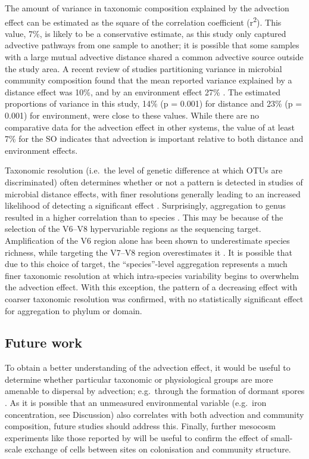 The amount of variance in taxonomic composition explained by the advection effect can be estimated as the square of the correlation coefficient (r\textsuperscript{2}).
This value, 7\%, is likely to be a conservative estimate, as this study only captured advective pathways from one sample to another; it is possible that some samples with a large mutual advective distance shared a common advective source outside the study area.
A recent review of studies partitioning variance in microbial community composition found that the mean reported variance explained by a distance effect was 10\%, and by an environment effect 27\% \cite{Hanson:2012cb}.
The estimated proportions of variance in this study, 14\% (p = 0.001) for distance and 23\% (p = 0.001) for environment, were close to these values.
While there are no comparative data for the advection effect in other systems, the value of at least 7\% for the \ac{SO} indicates that advection is important relative to both distance and environment effects. 

Taxonomic resolution (i.e.\ the level of genetic difference at which \acp{OTU} are discriminated) often determines whether or not a pattern is detected in studies of microbial distance effects, with finer resolutions generally leading to an increased likelihood of detecting a significant effect \cite{Hanson:2012cb}.
Surprisingly, aggregation to genus resulted in a higher correlation than to species .
This may be because of the selection of the V6--V8 hypervariable regions as the sequencing target.
Amplification of the V6 region alone has been shown to underestimate species richness, while targeting the V7--V8 region overestimates it \cite{Youssef:2009un}.
It is possible that due to this choice of target, the ``species''-level aggregation represents a much finer taxonomic resolution at which intra-species variability begins to overwhelm the advection effect.
With this exception, the pattern of a decreasing effect with coarser taxonomic resolution was confirmed, with no statistically significant effect for aggregation to phylum or domain.

\subsection{Future work}

To obtain a better understanding of the advection effect, it would be useful to determine whether particular taxonomic or physiological groups are more amenable to dispersal by advection; e.g.\ through the formation of dormant spores \cite{Sul:2013in, Bissett:2010wj}.
As it is possible that an unmeasured environmental variable (e.g.\ iron concentration, see Discussion) also correlates with both advection and community composition, future studies should address this.
Finally, further mesocosm experiments like those reported by \citet{Declerck:2013cz} will be useful to confirm the effect of small-scale exchange of cells between sites on colonisation and community structure.
